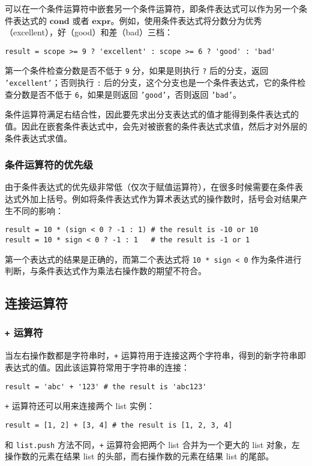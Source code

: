可以在一个条件运算符中嵌套另一个条件运算符，即条件表达式可以作为另一个条件表达式的 $\bm{cond}$ 或者 $\bm{expr}$。例如，使用条件表达式将分数分为优秀（excellent），好（good）和差（bad）三档：
\begin{lstlisting}[language=berry, numbers=none]
result = scope >= 9 ? 'excellent' : scope >= 6 ? 'good' : 'bad'
\end{lstlisting}

第一个条件检查分数是否不低于 \texttt{9} 分，如果是则执行 \texttt{?} 后的分支，返回 \texttt{'excellent'}；否则执行 \texttt{:} 后的分支，这个分支也是一个条件表达式，它的条件检查分数是否不低于 \texttt{6}，如果是则返回 \texttt{'good'}，否则返回 \texttt{'bad'}。

条件运算符满足右结合性，因此要先求出分支表达式的值才能得到条件表达式的值。因此在嵌套条件表达式中，会先对被嵌套的条件表达式求值，然后才对外层的条件表达式求值。

\subsubsection{条件运算符的优先级}

由于条件表达式的优先级非常低（仅次于赋值运算符），在很多时候需要在条件表达式外加上括号。例如将条件表达式作为算术表达式的操作数时，括号会对结果产生不同的影响：
\begin{lstlisting}[language=berry, numbers=none]
result = 10 * (sign < 0 ? -1 : 1) # the result is -10 or 10
result = 10 * sign < 0 ? -1 : 1   # the result is -1 or 1
\end{lstlisting}
第一个表达式的结果是正确的，而第二个表达式将 \texttt{10 * sign < 0} 作为条件进行判断，与条件表达式作为乘法右操作数的期望不符合。

\subsection{连接运算符}

\subsubsection{\texttt{+} 运算符}

当左右操作数都是字符串时，\texttt{+} 运算符用于连接这两个字符串，得到的新字符串即表达式的值。因此该运算符常用于字符串的连接：
\begin{lstlisting}[language=berry, numbers=none]
result = 'abc' + '123' # the result is 'abc123'
\end{lstlisting}

\texttt{+} 运算符还可以用来连接两个 list 实例：
\begin{lstlisting}[language=berry, numbers=none]
result = [1, 2] + [3, 4] # the result is [1, 2, 3, 4]
\end{lstlisting}
和 \texttt{list.push} 方法不同，\texttt{+} 运算符会把两个 list 合并为一个更大的 list 对象，左操作数的元素在结果 list 的头部，而右操作数的元素在结果 list 的尾部。

